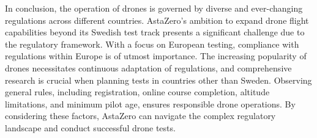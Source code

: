 \bigskip
In conclusion, the operation of drones is governed by diverse and ever-changing regulations across different countries. AstaZero's ambition to expand drone flight capabilities beyond its Swedish test track presents a significant challenge due to the regulatory framework. With a focus on European testing, compliance with regulations within Europe is of utmost importance. The increasing popularity of drones necessitates continuous adaptation of regulations, and comprehensive research is crucial when planning tests in countries other than Sweden. Observing general rules, including registration, online course completion, altitude limitations, and minimum pilot age, ensures responsible drone operations. By considering these factors, AstaZero can navigate the complex regulatory landscape and conduct successful drone tests.




